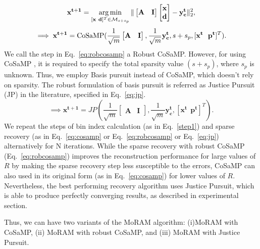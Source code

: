 $$
\mathbf{{x}^{t+1}}=\argmin_{[\mathbf{x~d}]^T \in \mathcal{M}_{s+s_p}}\norm{\begin{bmatrix} \mathbf{A} & \mathbf{I} \end{bmatrix} \begin{bmatrix} \mathbf{x} \\ \mathbf{d} \end{bmatrix} - \mathbf{y^t_c}}_2^2, %
$$
\begin{equation}
\implies \mathbf{{x^{t+1}}} = \mathrm{CoSaMP}(\frac{1}{\sqrt{m}}\begin{bmatrix} \mathbf{A} & \mathbf{I} \end{bmatrix},\frac{1}{\sqrt{m}}\mathbf{y_c^t},s+s_p,[\mathbf{x^t~~p^t}]^T).
\label{eq:robcosamp}
\end{equation}
We call the step in Eq.~\ref{eq:robcosamp} a Robust CoSaMP. 
However, for using CoSaMP , it is required to specify the total sparsity value $(s +s_p)$, where $s_p$ is unknown. Thus, we employ Basis pursuit instead of CoSaMP, which doesn't rely on sparsity. The robust formulation of basis pursuit is referred as Justice Pursuit (JP) in the literature, specified in Eq.~\ref{eq:jp}.
\begin{equation}
\implies \mathbf{{x^{t+1}}} = JP(\frac{1}{\sqrt{m}}\begin{bmatrix} \mathbf{A} & \mathbf{I} \end{bmatrix},\frac{1}{\sqrt{m}}\mathbf{y^t_c},[\mathbf{x^t~~p^t}]^T).
\label{eq:jp}
\end{equation}
We repeat the steps of bin index calculation (as in Eq.~\ref{step1}) and sparse recovery (as in Eq.~\ref{eq:cosamp} or Eq.~\ref{eq:robcosamp} or Eq.~\ref{eq:jp}) alternatively for $\mathrm{N}$ iterations. While the sparse recovery with robust CoSaMP (Eq.~\ref{eq:robcosamp}) improves the reconstruction performance for large values of $R$ by making the sparse recovery step less susceptible to the errors, CoSaMP can also used in its original form (as in Eq.~\ref{eq:cosamp}) for lower values of $R$. Nevertheless, the best performing recovery algorithm uses Justice Pursuit, which is able to produce perfectly converging results, as described in experimental section.

Thus, we can have two variants of the MoRAM algorithm: (i)MoRAM with CoSaMP, (ii) MoRAM with robust CoSaMP, and (iii) MoRAM with Justice Pursuit. 


%
